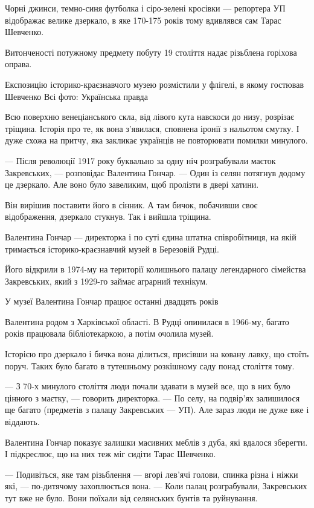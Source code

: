 Чорні джинси, темно-синя футболка і сіро-зелені кросівки --- репортера УП
відображає велике дзеркало, в яке 170-175 років тому вдивлявся сам Тарас
Шевченко.

Витонченості потужному предмету побуту 19 століття надає різьблена горіхова
оправа.

Експозицію історико-краєзнавчого музею розмістили у флігелі, в якому гостював
Шевченко Всі фото: Українська правда

Всю поверхню венеціанського скла, від лівого кута навскоси до низу, розрізає
тріщина. Історія про те, як вона з'явилася, сповнена іронії з нальотом смутку.
І дуже схожа на притчу, яка закликає українців не повторювати помилки минулого.

--- Після революції 1917 року буквально за одну ніч розграбували маєток
Закревських, --- розповідає Валентина Гончар. --- Один із селян потягнув додому це
дзеркало. Але воно було завеликим, щоб пролізти в двері хатини.

Він вирішив поставити його в сінник. А там бичок, побачивши своє відображення,
дзеркало стукнув. Так і вийшла тріщина.

Валентина Гончар --- директорка і по суті єдина штатна співробітниця, на якій
тримається історико-краєзнавчий музей в Березовій Рудці. 

Його відкрили в 1974-му на території колишнього палацу легендарного сімейства
Закревських, який з 1929-го займає аграрний технікум.

У музеї Валентина Гончар працює останні двадцять років

Валентина родом з Харківської області. В Рудці опинилася в 1966-му, багато
років працювала бібліотекаркою, а потім очолила музей.

Історією про дзеркало і бичка вона ділиться, присівши на ковану лавку, що
стоїть поруч. Таких було багато в тутешньому розкішному саду понад століття
тому.

--- З 70-х минулого століття люди почали здавати в музей все, що в них було
цінного з маєтку, --- говорить директорка. --- По селу, на подвір’ях залишилося ще
багато (предметів з палацу Закревських --- УП). Але зараз люди не дуже вже і
віддають.

Валентина Гончар показує залишки масивних меблів з дуба, які вдалося зберегти.
І підкреслює, що на них теж міг сидіти Тарас Шевченко.

--- Подивіться, яке там різьблення --- вгорі лев'ячі голови, спинка різна і ніжки
які, --- по-дитячому захоплюється вона. --- Коли палац розграбували, Закревських
тут вже не було. Вони поїхали від селянських бунтів та руйнування.

